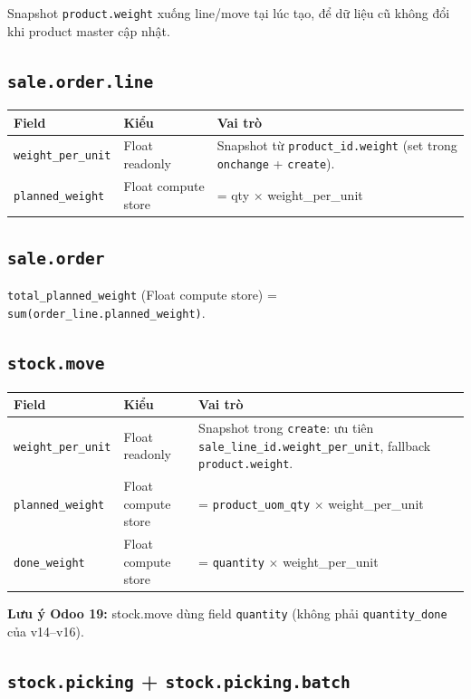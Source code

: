 Snapshot \texttt{product.weight} xuống line/move tại lúc tạo, để dữ liệu cũ không đổi khi product master cập nhật.

\subsection{\texttt{sale.order.line}}

\begin{longtable}{p{4cm} p{4cm} p{7cm}}
\toprule
\textbf{Field} & \textbf{Kiểu} & \textbf{Vai trò} \\
\midrule
\endhead
\texttt{weight\_per\_unit} & Float readonly & Snapshot từ \texttt{product\_id.weight} (set trong \texttt{onchange} + \texttt{create}). \\
\texttt{planned\_weight} & Float compute store & = qty $\times$ weight\_per\_unit \\
\bottomrule
\end{longtable}

\subsection{\texttt{sale.order}}

\texttt{total\_planned\_weight} (Float compute store) = \texttt{sum(order\_line.planned\_weight)}.

\subsection{\texttt{stock.move}}

\begin{longtable}{p{4cm} p{4cm} p{7cm}}
\toprule
\textbf{Field} & \textbf{Kiểu} & \textbf{Vai trò} \\
\midrule
\endhead
\texttt{weight\_per\_unit} & Float readonly & Snapshot trong \texttt{create}: ưu tiên \texttt{sale\_line\_id.weight\_per\_unit}, fallback \texttt{product.weight}. \\
\texttt{planned\_weight} & Float compute store & = \texttt{product\_uom\_qty} $\times$ weight\_per\_unit \\
\texttt{done\_weight} & Float compute store & = \texttt{quantity} $\times$ weight\_per\_unit \\
\bottomrule
\end{longtable}

\textbf{Lưu ý Odoo 19:} stock.move dùng field \texttt{quantity} (không phải \texttt{quantity\_done} của v14--v16).

\subsection{\texttt{stock.picking} + \texttt{stock.picking.batch}}

